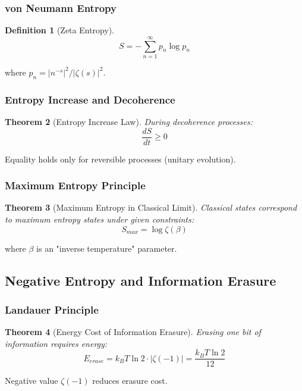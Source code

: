 \documentclass[11pt]{article}
\theoremstyle{plain}
\newtheorem{theorem}{Theorem}[section]
\theoremstyle{definition}
\newtheorem{definition}[theorem]{Definition}
\theoremstyle{remark}
\begin{document}
\subsubsection{von Neumann Entropy}

\begin{definition}[Zeta Entropy]
$$S = -\sum_{n=1}^{\infty} p_n \log p_n$$
\end{definition}

where $p_n = |n^{-s}|^2/|\zeta(s)|^2$.

\subsubsection{Entropy Increase and Decoherence}

\begin{theorem}[Entropy Increase Law]
During decoherence processes:
$$\frac{dS}{dt} \geq 0$$
\end{theorem}

Equality holds only for reversible processes (unitary evolution).

\subsubsection{Maximum Entropy Principle}

\begin{theorem}[Maximum Entropy in Classical Limit]
Classical states correspond to maximum entropy states under given constraints:
$$S_{max} = \log \zeta(\beta)$$
\end{theorem}

where $\beta$ is an "inverse temperature" parameter.

\subsection{Negative Entropy and Information Erasure}

\subsubsection{Landauer Principle}

\begin{theorem}[Energy Cost of Information Erasure]
Erasing one bit of information requires energy:
$$E_{erase} = k_B T \ln 2 \cdot |\zeta(-1)| = \frac{k_B T \ln 2}{12}$$
\end{theorem}

Negative value $\zeta(-1)$ reduces erasure cost.
\end{document}
